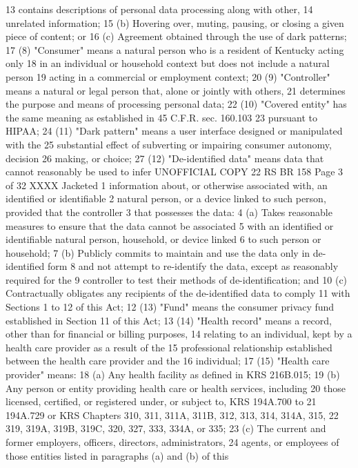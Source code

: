 13 contains descriptions of personal data processing along with other,
14 unrelated information;
15 (b) Hovering over, muting, pausing, or closing a given piece of content; or
16 (c) Agreement obtained through the use of dark patterns;
17 (8) "Consumer" means a natural person who is a resident of Kentucky acting only
18 in an individual or household context but does not include a natural person
19 acting in a commercial or employment context;
20 (9) "Controller" means a natural or legal person that, alone or jointly with others,
21 determines the purpose and means of processing personal data;
22 (10) "Covered entity" has the same meaning as established in 45 C.F.R. sec. 160.103
23 pursuant to HIPAA;
24 (11) "Dark pattern" means a user interface designed or manipulated with the
25 substantial effect of subverting or impairing consumer autonomy, decision
26 making, or choice;
27 (12) "De-identified data" means data that cannot reasonably be used to infer 
UNOFFICIAL COPY 22 RS BR 158
Page 3 of 32
XXXX Jacketed
1 information about, or otherwise associated with, an identified or identifiable
2 natural person, or a device linked to such person, provided that the controller
3 that possesses the data:
4 (a) Takes reasonable measures to ensure that the data cannot be associated
5 with an identified or identifiable natural person, household, or device linked
6 to such person or household;
7 (b) Publicly commits to maintain and use the data only in de-identified form
8 and not attempt to re-identify the data, except as reasonably required for the
9 controller to test their methods of de-identification; and
10 (c) Contractually obligates any recipients of the de-identified data to comply
11 with Sections 1 to 12 of this Act;
12 (13) "Fund" means the consumer privacy fund established in Section 11 of this Act;
13 (14) "Health record" means a record, other than for financial or billing purposes,
14 relating to an individual, kept by a health care provider as a result of the
15 professional relationship established between the health care provider and the
16 individual;
17 (15) "Health care provider" means:
18 (a) Any health facility as defined in KRS 216B.015;
19 (b) Any person or entity providing health care or health services, including
20 those licensed, certified, or registered under, or subject to, KRS 194A.700 to
21 194A.729 or KRS Chapters 310, 311, 311A, 311B, 312, 313, 314, 314A, 315,
22 319, 319A, 319B, 319C, 320, 327, 333, 334A, or 335;
23 (c) The current and former employers, officers, directors, administrators,
24 agents, or employees of those entities listed in paragraphs (a) and (b) of this
